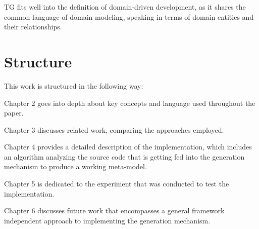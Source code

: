 \n

TG fits well into the definition of domain-driven development, as it shares the common language of domain modeling, speaking in terms of domain entities and their relationships.

\section{Structure}

This work is structured in the following way: 

\n

Chapter 2 goes into depth about key concepts and language used throughout the paper.

\n

Chapter 3 discusses related work, comparing the approaches employed.

\n

Chapter 4 provides a detailed description of the implementation, which includes an algorithm analyzing the source code that is getting fed into the generation mechanism to produce a working meta-model.

\n

Chapter 5 is dedicated to the experiment that was conducted to test the implementation.

\n

Chapter 6 discusses future work that encompasses a general framework independent approach to implementing the generation mechanism.
